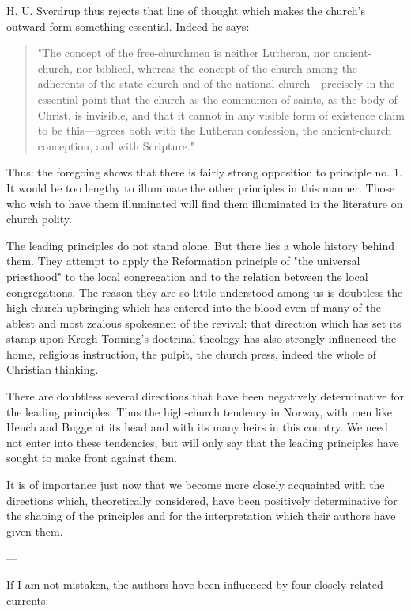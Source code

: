 H. U. Sverdrup thus rejects that line of thought which makes the church’s outward form something essential. Indeed he says:

\begin{quote}
"The concept of the free-churchmen is neither Lutheran, nor ancient-church, nor biblical, whereas the concept of the church among the adherents of the state church and of the national church—precisely in the essential point that the church as the communion of saints, as the body of Christ, is invisible, and that it cannot in any visible form of existence claim to be this—agrees both with the Lutheran confession, the ancient-church conception, and with Scripture."
\end{quote}

Thus: the foregoing shows that there is fairly strong opposition to principle no. 1. It would be too lengthy to illuminate the other principles in this manner. Those who wish to have them illuminated will find them illuminated in the literature on church polity.

The leading principles do not stand alone. But there lies a whole history behind them. They attempt to apply the Reformation principle of "the universal priesthood" to the local congregation and to the relation between the local congregations. The reason they are so little understood among us is doubtless the high-church upbringing which has entered into the blood even of many of the ablest and most zealous spokesmen of the revival: that direction which has set its stamp upon Krogh-Tonning’s doctrinal theology has also strongly influenced the home, religious instruction, the pulpit, the church press, indeed the whole of Christian thinking.

There are doubtless several directions that have been negatively determinative for the leading principles. Thus the high-church tendency in Norway, with men like Heuch and Bugge at its head and with its many heirs in this country. We need not enter into these tendencies, but will only say that the leading principles have sought to make front against them.

It is of importance just now that we become more closely acquainted with the directions which, theoretically considered, have been positively determinative for the shaping of the principles and for the interpretation which their authors have given them.

---

If I am not mistaken, the authors have been influenced by four closely related currents:

